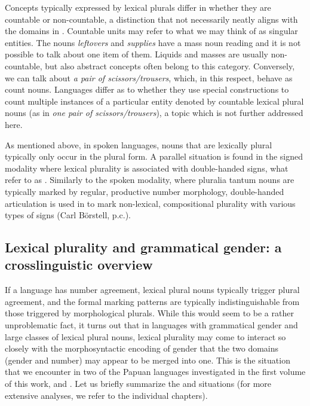 \documentclass[output=collectionpaper]{langsci/langscibook}
\begin{document}
Concepts typically expressed by lexical plurals differ in whether they are countable or non-countable, a distinction that not necessarily neatly aligns with the domains in . Countable units may refer to what we may think of as singular entities. The  nouns \textit{leftovers} and \textit{supplies} have a mass noun reading and it is not possible to talk about one item of them. Liquids and masses are usually non-countable, but also abstract concepts often belong to this category. Conversely, we can talk about \textit{a pair of scissors/trousers}, which, in this respect, behave as count nouns. Languages differ as to whether they use special constructions to count multiple instances of a particular entity denoted by countable lexical plural nouns (as in  \textit{one pair of scissors/trousers}), a topic which is not further addressed here.

As mentioned above, in spoken languages, nouns that are lexically plural typically only occur in the plural form. A parallel situation is found in the signed modality where lexical plurality is associated with double-handed signs, what \cite{Boerstell2017} refer to as . Similarly to the spoken modality, where pluralia tantum nouns are typically marked by regular, productive number morphology, double-handed articulation is used in  to mark non-lexical, compositional plurality with various types of signs (Carl Börstell, p.c.).

\subsection{Lexical plurality and grammatical gender: a crosslinguistic overview}\label{sec:WDG:9.2}

If a language has number agreement, lexical plural nouns typically trigger plural agreement, and the formal marking patterns are typically indistinguishable from those triggered by morphological plurals. While this would seem to be a rather unproblematic fact, it turns out that in languages with grammatical gender and large classes of lexical plural nouns, lexical plurality may come to interact so closely with the morphosyntactic encoding of gender that the two domains (gender and number) may appear to be merged into one. This is the situation that we encounter in two of the Papuan languages investigated in the first volume of this work,  \citep{chapters/08} and  \citep{chapters/07}. Let us briefly summarize the  and  situations (for more extensive analyses, we refer to the individual chapters).
\end{document}
